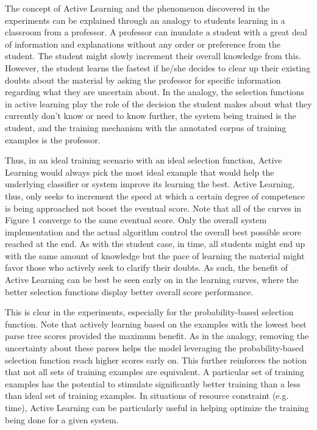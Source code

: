 \documentclass{article} %
\begin{document}
The concept of Active Learning and the phenomenon discovered in the experiments can be explained through an analogy to students learning in a classroom from a professor. A professor can inundate a student with a great deal of information and explanations without any order or preference from the student. The student might slowly increment their overall knowledge from this. However, the student learns the fastest if he/she decides to clear up their existing doubts about the material by asking the professor for specific information regarding what they are uncertain about. In the analogy, the selection functions in active learning play the role of the decision the student makes about what they currently don't know or need to know further, the system being trained is the student, and the training mechanism with the annotated corpus of training examples is the professor.

Thus, in an ideal training scenario with an ideal selection function, Active Learning would always pick the most ideal example that would help the underlying classifier or system improve its learning the best. Active Learning, thus, only seeks to increment the speed at which a certain degree of competence is being approached not boost the eventual score. Note that all of the curves in Figure 1 converge to the same eventual score. Only the overall system implementation and the actual algorithm control the overall best possible score reached at the end. As with the student case, in time, all students might end up with the same amount of knowledge but the pace of learning the material might favor those who actively seek to clarify their doubts. As such, the benefit of Active Learning can be best be seen early on in the learning curves, where the better selection functions display better overall score performance. 

This is clear in the experiments, especially for the probability-based selection function. Note that actively learning based on the examples with the lowest best parse tree scores provided the maximum benefit. As in the analogy, removing the uncertainty about these parses helps the model leveraging the probability-based selection function reach higher scores early on. This further reinforces the notion that not all sets of training examples are equivalent. A particular set of training examples has the potential to stimulate significantly better training than a less than ideal set of training examples. In situations of resource constraint (e.g. time), Active Learning can be particularly useful in helping optimize the training being done for a given system.
\end{document}
